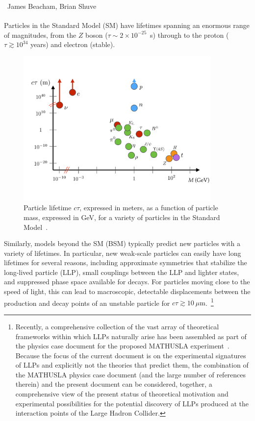 ~James Beacham, Brian Shuve \\
\text{ \; }\\

\noindent Particles in the Standard Model (SM) have lifetimes spanning an enormous range of magnitudes, from the $Z$ boson ($\tau\sim2\times10^{-25}$~s) through to the proton ($\tau\gtrsim10^{34}$ years) and electron (stable).

\begin{figure}[htb]
\centering
\includegraphics[width=0.9\textwidth]{plots/lifetime_plot.pdf}
\caption{Particle lifetime $c\tau$, expressed in meters, as a function of particle mass, expressed in GeV, for a variety of particles in the Standard Model~\cite{Shuve:2017AprilWorkshop}.}
 \label{fig:SMLifetimes}
\end{figure}

Similarly, models beyond the SM (BSM) typically predict new particles with a variety of lifetimes.
In particular, new weak-scale particles can easily have long lifetimes for several reasons, including approximate symmetries that stabilize the long-lived particle (LLP), small couplings between the LLP and lighter states, and suppressed phase space available for decays.
For particles moving close to the speed of light, this can lead to macroscopic, detectable displacements between the production and decay points of an unstable particle for $c\tau\gtrsim 10~\mu\mathrm{m}$.~\footnote{Recently, a comprehensive collection of the vast array of theoretical frameworks within which LLPs naturally arise has been assembled as part of the physics case document for the proposed MATHUSLA experiment~\cite{Curtin:2018mvb}. Because the focus of the current document is on the experimental signatures of LLPs and explicitly not the theories that predict them,
the combination of the MATHUSLA physics case document (and the large number of references therein) and the present document can be considered, together, a comprehensive view of the present status of theoretical motivation and experimental possibilities for the potential discovery of LLPs produced at the interaction points of the Large Hadron Collider.}



